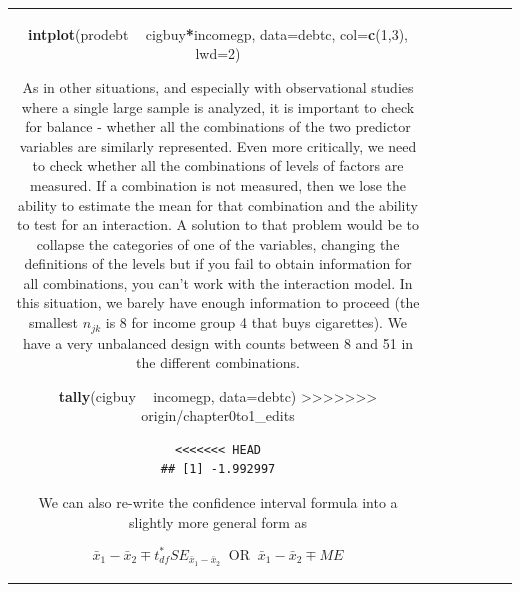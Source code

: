 \documentclass[]{book}
\newenvironment{Shaded}{\begin{snugshade}}{\end{snugshade}}
\newcommand{\KeywordTok}[1]{\textcolor[rgb]{0.13,0.29,0.53}{\textbf{#1}}}
\newcommand{\DataTypeTok}[1]{\textcolor[rgb]{0.13,0.29,0.53}{#1}}
\newcommand{\DecValTok}[1]{\textcolor[rgb]{0.00,0.00,0.81}{#1}}
\newcommand{\StringTok}[1]{\textcolor[rgb]{0.31,0.60,0.02}{#1}}
\newcommand{\OperatorTok}[1]{\textcolor[rgb]{0.81,0.36,0.00}{\textbf{#1}}}
\newcommand{\NormalTok}[1]{#1}
\theoremstyle{definition}
\theoremstyle{definition}
\theoremstyle{remark}
\begin{document}
\begin{longtable}[]{@{}ccccccc@{}}
\begin{minipage}[b]{0.10\columnwidth}
\begin{Shaded}
\begin{Highlighting}[]
\begin{Shaded}
\begin{Highlighting}[]
\begin{Shaded}
\begin{Highlighting}[]
\begin{Shaded}
\begin{Highlighting}[]
\KeywordTok{intplot}\NormalTok{(prodebt }\OperatorTok{~}\StringTok{ }\NormalTok{cigbuy}\OperatorTok{*}\NormalTok{incomegp, }\DataTypeTok{data=}\NormalTok{debtc, }\DataTypeTok{col=}\KeywordTok{c}\NormalTok{(}\DecValTok{1}\NormalTok{,}\DecValTok{3}\NormalTok{), }\DataTypeTok{lwd=}\DecValTok{2}\NormalTok{)}
\end{Highlighting}
\end{Shaded}

As in other situations, and especially with observational studies where
a single large sample is analyzed, it is important to check for balance
- whether all the combinations of the two predictor variables are
similarly represented. Even more critically, we need to check whether
all the combinations of levels of factors are measured. If a combination
is not measured, then we lose the ability to estimate the mean for that
combination and the ability to test for an interaction. A solution to
that problem would be to collapse the categories of one of the
variables, changing the definitions of the levels but if you fail to
obtain information for all combinations, you can't work with the
interaction model. In this situation, we barely have enough information
to proceed (the smallest \(n_{jk}\) is 8 for income group 4 that buys
cigarettes). We have a very unbalanced design with counts between 8 and
51 in the different combinations.

\begin{Shaded}
\begin{Highlighting}[]
\KeywordTok{tally}\NormalTok{(cigbuy }\OperatorTok{~}\StringTok{ }\NormalTok{incomegp, }\DataTypeTok{data=}\NormalTok{debtc)}
>>>>>>> origin/chapter0to1_edits
\end{Highlighting}
\end{Shaded}

\begin{verbatim}
<<<<<<< HEAD
## [1] -1.992997
\end{verbatim}

We can also re-write the confidence interval formula into a slightly
more general form as

\[\bar{x}_1 - \bar{x}_2 \mp t^*_{df}SE_{\bar{x}_1 - \bar{x}_2}\ \text{ OR }\ 
\bar{x}_1 - \bar{x}_2 \mp ME\]


\end{Highlighting}
\end{Shaded}
\end{Highlighting}
\end{Shaded}
\end{Highlighting}
\end{Shaded}
\end{minipage}
\end{longtable}
\end{document}

